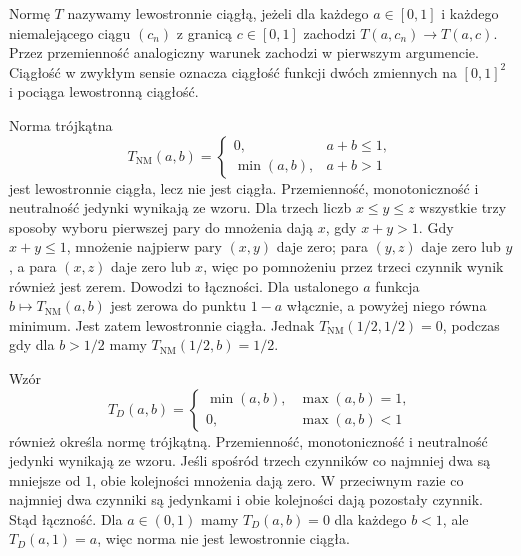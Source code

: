 \begin{definicja}\label{def:ncl-left-continuity}
Normę $T$ nazywamy lewostronnie ciągłą, jeżeli dla każdego
$a\in[0,1]$ i każdego niemalejącego ciągu $(c_n)$ z granicą
$c\in[0,1]$ zachodzi
$T(a,c_n)\to T(a,c)$. Przez przemienność analogiczny
warunek zachodzi w pierwszym argumencie. Ciągłość
w zwykłym sensie oznacza ciągłość funkcji dwóch zmiennych
na $[0,1]^2$ i pociąga lewostronną ciągłość.
\end{definicja}

\begin{przyklad}\label{ex:ncl-nilpotent-minimum}
Norma trójkątna
\[
 T_{\mathrm{NM}}(a,b)=
 \begin{cases}
 0,&a+b\leq1,\\
 \min(a,b),&a+b>1
 \end{cases}
\]
jest lewostronnie ciągła, lecz nie jest ciągła.
Przemienność, monotoniczność i neutralność jedynki wynikają
ze wzoru. Dla trzech liczb $x\leq y\leq z$ wszystkie trzy
sposoby wyboru pierwszej pary do mnożenia dają $x$,
gdy $x+y>1$. Gdy $x+y\leq1$, mnożenie najpierw pary
$(x,y)$ daje zero; para $(y,z)$ daje zero lub $y$, a para
$(x,z)$ daje zero lub $x$, więc po pomnożeniu przez trzeci
czynnik wynik również jest zerem. Dowodzi to łączności.
Dla ustalonego $a$ funkcja $b\mapsto T_{\mathrm{NM}}(a,b)$
jest zerowa do punktu $1-a$ włącznie, a powyżej niego
równa minimum. Jest zatem lewostronnie ciągła.
Jednak $T_{\mathrm{NM}}(1/2,1/2)=0$, podczas gdy dla
$b>1/2$ mamy $T_{\mathrm{NM}}(1/2,b)=1/2$.
\end{przyklad}

\begin{przyklad}\label{ex:ncl-drastic-product}
Wzór
\[
 T_D(a,b)=
 \begin{cases}
 \min(a,b),&\max(a,b)=1,\\
 0,&\max(a,b)<1
 \end{cases}
\]
również określa normę trójkątną. Przemienność,
monotoniczność i neutralność jedynki wynikają ze wzoru.
Jeśli spośród trzech czynników co najmniej dwa są mniejsze
od $1$, obie kolejności mnożenia dają zero. W przeciwnym
razie co najmniej dwa czynniki są jedynkami i obie
kolejności dają pozostały czynnik. Stąd łączność.
Dla $a\in(0,1)$ mamy $T_D(a,b)=0$ dla każdego $b<1$,
ale $T_D(a,1)=a$, więc norma nie jest lewostronnie ciągła.
\end{przyklad}

